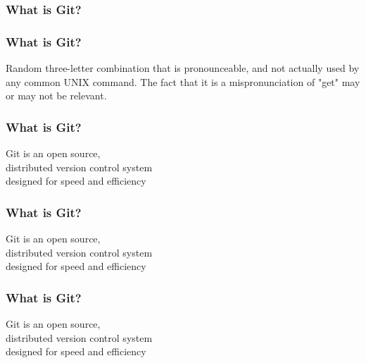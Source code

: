 \begin{frame}
    \frametitle{What is Git?}
\end{frame}

\begin{frame}
    \frametitle{What is Git?}
    Random three-letter combination that is pronounceable, and not actually
    used by any common UNIX command. The fact that it is a mispronunciation of
    "get" may or may not be relevant.
\end{frame}

\begin{frame}
    \frametitle{What is Git?}
    \centering
    Git is an open source,\\
    distributed version control system\\
    designed for speed and efficiency
\end{frame}

\begin{frame}
    \frametitle{What is Git?}
    \centering
    Git is an \alert{open source},\\
    distributed version control system\\
    designed for speed and efficiency
\end{frame}

\begin{frame}
    \frametitle{What is Git?}
    \centering
    Git is an open source,\\
    \alert{distributed} version control system\\
    designed for speed and efficiency
\end{frame}

